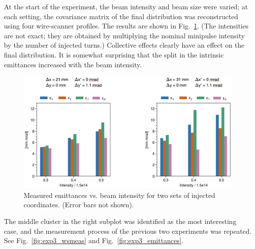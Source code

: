 At the start of the experiment, the beam intensity and beam size were varied; at each setting, the covariance matrix of the final distribution was reconstructed using four wire-scanner profiles. The results are shown in Fig.~\ref{fig:exp3_search}. (The intensities are not exact; they are obtained by multiplying the nominal minipulse intensity by the number of injected turns.) Collective effects clearly have an effect on the final distribution. It is somewhat surprising that the split in the intrinsic emittances increased with the beam intensity. 
%
\begin{figure}[!p]
    \centering
    \vspace*{1.0cm}
    \includegraphics[width=\textwidth]{Images/chapter5/exp3/search.png}
    \caption{Measured emittances vs. beam intensity for two sets of injected coordinates. (Error bars not shown).}
    \label{fig:exp3_search}
    \vspace*{1.0cm}
\end{figure}
%
The middle cluster in the right subplot was identified as the most interesting case, and the measurement process of the previous two experiments was repeated. See Fig.~\ref{fig:exp3_wsmeas} and Fig.~\ref{fig:exp3_emittances}.
%
